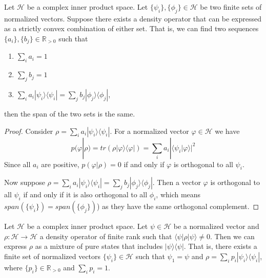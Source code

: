 \documentclass[10pt,twocolumn, nofootinbib]{revtex4-2}
\def\>{\rangle}
\def\<{\langle}
\begin{document}
\begin{prop}\label{prop_densitySpan}
Let $\mathcal{H}$ be a complex inner product space. Let $\{\psi_i\}, \{\phi_j\} \in \mathcal{H}$ be two finite sets of normalized vectors. Suppose there exists a density operator that can be expressed as a strictly convex combination of either set. That is, we can find two sequences $\{a_i\}, \{b_j\} \in \mathbb{R}_{>0}$ such that
\begin{enumerate}
\item $\sum_i a_i = 1$
\item $\sum_j b_j = 1$
\item $\sum_i a_i |\psi_i\>\<\psi_i| = \sum_j b_j |\phi_j\>\<\phi_j|$,
\end{enumerate}
then the span of the two sets is the same.
\end{prop}

\begin{proof}
Consider $\rho = \sum_i a_i |\psi_i\>\<\psi_i|$. For a normalized vector $\varphi \in \mathcal{H}$ we have
$$p(\varphi|\rho)=tr(\rho |\varphi\>\<\varphi|) = \sum_i a_i |\<\psi_i|\varphi\>|^2$$
Since all $a_i$ are positive, $p(\varphi|\rho) = 0$ if and only if $\varphi$ is orthogonal to all $\psi_i$.

Now suppose $\rho = \sum_i a_i |\psi_i\>\<\psi_i| = \sum_j b_j |\phi_j\>\<\phi_j|$. Then a vector $\varphi$ is orthogonal to all $\psi_i$ if and only if it is also orthogonal to all $\phi_i$, which means $span(\{\psi_i\}) = span(\{\phi_j\})$) as they have the same orthogonal complement.
\end{proof}

\begin{prop}\label{prop_decomposition}
Let $\mathcal{H}$ be a complex inner product space. Let $\psi \in \mathcal{H}$ be a normalized vector and $\rho : \mathcal{H} \to \mathcal{H}$ a density operator of finite rank such that $\<\psi|\rho|\psi\>\neq 0$. Then we can express $\rho$ as a mixture of pure states that includes $|\psi\>\<\psi|$. That is, there exists a finite set of normalized vectors $\{\psi_i\} \in \mathcal{H}$ such that $\psi_1 = \psi$ and $\rho = \sum_i p_i |\psi_i\>\<\psi_i|$, where $\{p_i\} \in \mathbb{R}_{>0}$ and $\sum_i p_i = 1$.
\end{prop}
\end{document}
